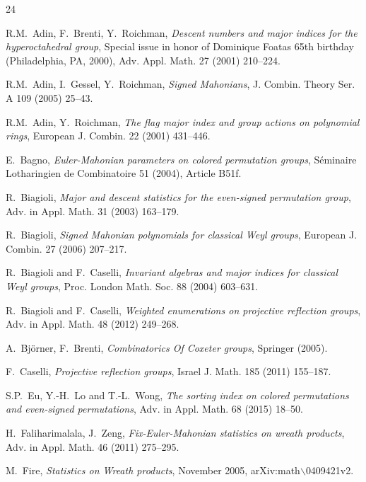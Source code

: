 \documentclass[a4paper, reqno, 11pt]{amsart}
\numberwithin{equation}{section}
\begin{document}
\rm
\bigskip
\begin{thebibliography}{24}

R.M.~Adin, F.~Brenti, Y.~Roichman, \emph{Descent numbers and major indices for the hyperoctahedral group}, Special issue in honor of Dominique Foatas 65th birthday (Philadelphia, PA, 2000), Adv. Appl. Math. 27 (2001) 210--224.

R.M.~Adin, I.~Gessel, Y.~Roichman, \emph{Signed Mahonians}, J. Combin. Theory Ser. A 109 (2005) 25--43.

R.M.~Adin, Y.~Roichman, \emph{The flag major index and group actions on polynomial rings}, European J. Combin. 22 (2001) 431--446.

E.~Bagno, \emph{Euler-Mahonian parameters on colored permutation groups}, S\'{e}minaire Lotharingien de Combinatoire 51 (2004), Article B51f.

R.~Biagioli, \emph{Major and descent statistics for the even-signed permutation group}, Adv. in Appl. Math. 31 (2003) 163--179.

R.~Biagioli, \emph{Signed Mahonian polynomials for classical Weyl groups}, European J. Combin. 27 (2006) 207--217.

R.~Biagioli and F.~Caselli, \emph{Invariant algebras and major indices for classical Weyl groups}, Proc. London Math. Soc. 88 (2004) 603--631.

R.~Biagioli and F.~Caselli, \emph{Weighted enumerations on projective reflection groups},
Adv. in Appl. Math. 48 (2012) 249--268.

A.~Bj\"{o}rner, F.~Brenti, \emph{Combinatorics Of Coxeter groups}, Springer (2005).

F.~Caselli, \emph{Projective reflection groups}, Israel J. Math. 185 (2011) 155--187.

S.P.~Eu, Y.-H.~Lo and T.-L.~Wong, \emph{The sorting index on colored permutations and even-signed permutations}, Adv. in Appl. Math. 68 (2015) 18--50.

H.~Faliharimalala, J.~Zeng, \emph{Fix-Euler-Mahonian statistics on wreath products}, Adv. in Appl. Math. 46 (2011) 275--295.

M.~Fire, \emph{Statistics on Wreath products}, November 2005, arXiv:math$\backslash$0409421v2.


\end{thebibliography}
\end{document}
